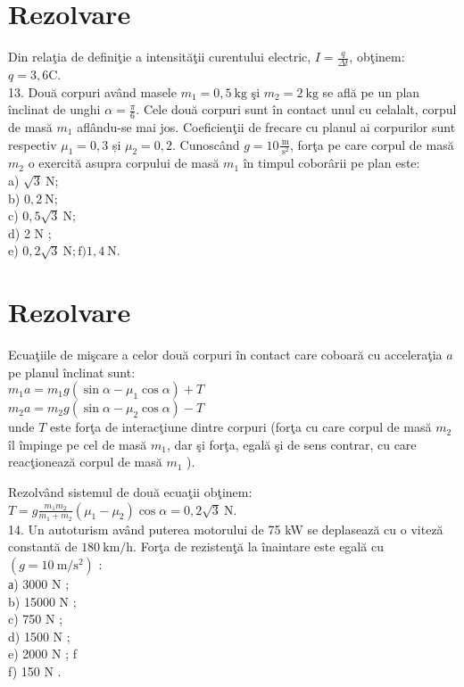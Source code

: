 \section*{Rezolvare}
Din relaţia de definiţie a intensităţii curentului electric, $I=\frac{q}{\Delta t}$, obţinem: $q=3,6 \mathrm{C}$.\\
13. Două corpuri având masele $m_{1}=0,5 \mathrm{~kg}$ şi $m_{2}=2 \mathrm{~kg}$ se află pe un plan înclinat de unghi $\alpha=\frac{\pi}{6}$. Cele două corpuri sunt în contact unul cu celalalt, corpul de masă $m_{1}$ aflându-se mai jos. Coeficienţii de frecare cu planul ai corpurilor sunt respectiv $\mu_{1}=0,3$ și $\mu_{2}=0,2$. Cunoscând $g=10 \frac{\mathrm{~m}}{\mathrm{~s}^{2}}$, forţa pe care corpul de masă $m_{2}$ o exercită asupra corpului de masă $m_{1}$ în timpul coborârii pe plan este:\\
a) $\sqrt{3} \mathrm{~N}$;\\
b) $0,2 \mathrm{~N}$;\\
c) $0,5 \sqrt{3} \mathrm{~N}$;\\
d) 2 N ;\\
e) $0,2 \sqrt{3} \mathrm{~N} ; \mathrm{f}) 1,4 \mathrm{~N}$.

\section*{Rezolvare}
Ecuaţiile de mişcare a celor două corpuri în contact care coboară cu acceleraţia $a$ pe planul înclinat sunt:\\
$m_{1} a=m_{1} g\left(\sin \alpha-\mu_{1} \cos \alpha\right)+T$\\
$m_{2} a=m_{2} g\left(\sin \alpha-\mu_{2} \cos \alpha\right)-T$\\
unde $T$ este forţa de interacţiune dintre corpuri (forţa cu care corpul de masă $m_{2}$ îl împinge pe cel de masă $m_{1}$, dar şi forţa, egală şi de sens contrar, cu care reacţionează corpul de masă $m_{1}$ ).

Rezolvând sistemul de două ecuaţii obţinem:\\
$T=g \frac{m_{1} m_{2}}{m_{1}+m_{2}}\left(\mu_{1}-\mu_{2}\right) \cos \alpha=0,2 \sqrt{3} \mathrm{~N}$.\\
14. Un autoturism având puterea motorului de 75 kW se deplasează cu o viteză constantă de $180 \mathrm{~km} / \mathrm{h}$. Forţa de rezistenţă la înaintare este egală cu $\left(g=10 \mathrm{~m} / \mathrm{s}^{2}\right)$ :\\
а) 3000 N ;\\
b) 15000 N ;\\
c) 750 N ;\\
d) 1500 N ;\\
e) 2000 N ; f\\
f) 150 N .

